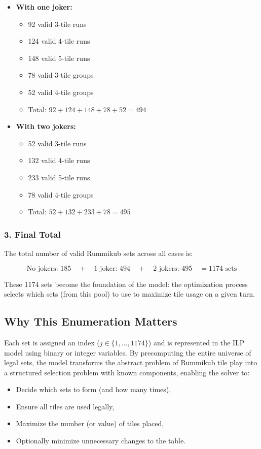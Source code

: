 \documentclass[11pt,letterpaper]{article}
\begin{document}
\begin{itemize}
    \item \textbf{With one joker:}
    \begin{itemize}
        \item 92 valid 3-tile runs
        \item 124 valid 4-tile runs
        \item 148 valid 5-tile runs
        \item 78 valid 3-tile groups
        \item 52 valid 4-tile groups
        \item Total: $92 + 124 + 148 + 78 + 52 = 494$
    \end{itemize}

    \item \textbf{With two jokers:}
    \begin{itemize}
        \item 52 valid 3-tile runs
        \item 132 valid 4-tile runs
        \item 233 valid 5-tile runs
        \item 78 valid 4-tile groups
        \item Total: $52 + 132 + 233 + 78 = 495$
    \end{itemize}
\end{itemize}

\subsubsection*{3. Final Total}

The total number of valid Rummikub sets across all cases is:

\[
\text{No jokers: } 185 \quad + \quad \text{1 joker: } 494 \quad + \quad \text{2 jokers: } 495 \quad = \boxed{1174 \text{ sets}}
\]

These 1174 sets become the foundation of the model: the optimization process selects which sets (from this pool) to use to maximize tile usage on a given turn.

\subsection{Why This Enumeration Matters}

Each set is assigned an index ($j \in \{1, \dots, 1174\}$) and is represented in the ILP model using binary or integer variables. By precomputing the entire universe of legal sets, the model transforms the abstract problem of Rummikub tile play into a structured selection problem with known components, enabling the solver to:
\begin{itemize}
    \item Decide which sets to form (and how many times),
    \item Ensure all tiles are used legally,
    \item Maximize the number (or value) of tiles placed,
    \item Optionally minimize unnecessary changes to the table.
\end{itemize}
\end{document}
